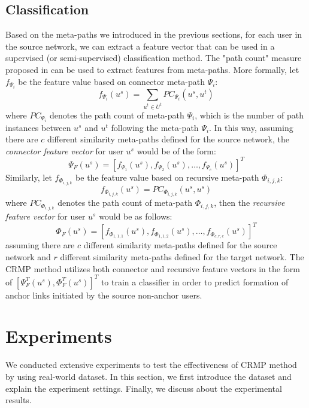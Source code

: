 \documentclass[conference]{IEEEtran}
\begin{document}
\subsection{Classification}
Based on the meta-paths we introduced in the previous sections, for each user in the source network, we can extract a feature vector that can be used in a supervised (or semi-supervised) classification method. The "path count" measure proposed in \cite{sun2012mining} can be used to extract features from meta-paths. More formally, let $f_{\Psi_i}$ be the feature value based on connector meta-path $\Psi_i$:
\begin{equation}
f_{\Psi_i}(u^s)=\sum_{u^t\in U^t}PC_{\Psi_i}(u^s,u^t)
\end{equation}
where $PC_{\Psi_i}$ denotes the path count of meta-path $\Psi_i$, which is the number of path instances between $u^s$ and $u^t$ following the meta-path $\Psi_i$. In this way, assuming there are $c$ different similarity meta-paths defined for the source network, the \textit{connector feature vector} for user $u^s$ would be of the form:
\begin{equation}
\Psi_F(u^s) = [f_{\Psi_1}(u^s), f_{\Psi_2}(u^s), \dots, f_{\Psi_c}(u^s)]^T
\end{equation}
Similarly, let $f_{\Phi_{i,j,k}}$ be the feature value based on recursive meta-path $\Phi_{i,j,k}$:
\begin{equation}
f_{\Phi_{i,j,k}}(u^s)=PC_{\Phi_{i,j,k}}(u^s,u^s)
\end{equation}
where $PC_{\Phi_{i,j,k}}$ denotes the path count of meta-path $\Phi_{i,j,k}$, then the \textit{recursive feature vector} for user $u^s$ would be as follows:
\begin{equation}
\Phi_F(u^s) = [f_{\Phi_{1,1,1}}(u^s), f_{\Phi_{1,1,2}}(u^s), \dots, f_{\Phi_{c,r,c}}(u^s)]^T
\end{equation}
assuming there are $c$ different similarity meta-paths defined for the source network and $r$ different similarity meta-paths defined for the target network.
The CRMP method utilizes both connector and recursive feature vectors in the form of $\left[\Psi_F^T(u^s),\Phi_F^T(u^s)\right]^T$ to train a classifier in order to predict formation of anchor links initiated by the source non-anchor users.

\section{Experiments}\label{sec:experiments}
We conducted extensive experiments to test the effectiveness of CRMP method by using real-world dataset. In this section, we first introduce the dataset and explain the experiment settings. Finally, we discuss about the experimental results.
\end{document}
